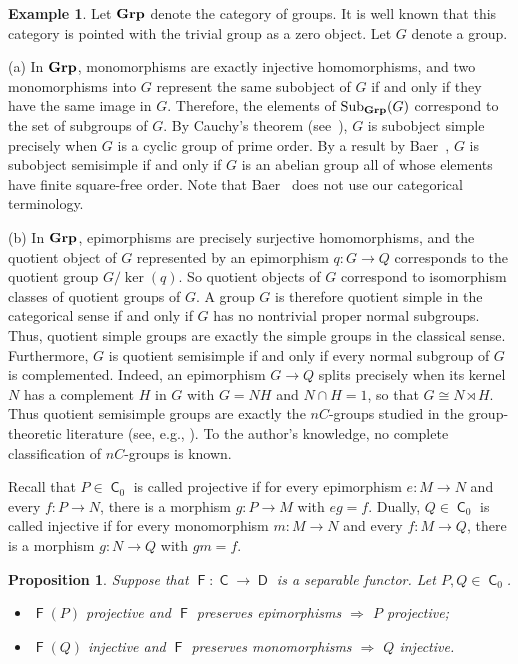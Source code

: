 \documentclass[12pt]{amsart}
\newtheorem{prop}[thm]{Proposition}
\theoremstyle{definition}
\newtheorem{exa}[thm]{Example}
\newcommand{\Grp}{{\bf Grp}}
\DeclareMathOperator{\C}{\mathsf C}
\DeclareMathOperator{\D}{\mathsf D}
\DeclareMathOperator{\Sub}{Sub}
\DeclareMathOperator{\F}{\mathsf F}
\begin{document}
\begin{exa}
Let $\Grp$ denote the category of groups.
It is well known that this category is
pointed with the trivial group as a 
zero object. Let $G$ denote a group.

(a) In $\Grp$, monomorphisms are exactly 
injective homomorphisms, and two 
monomorphisms into $G$ represent the 
same subobject of $G$ if and only if 
they have the same image in $G$.
Therefore, the elements of $\Sub_{\Grp}(G)$
correspond to the set of subgroups of $G$.
By Cauchy's theorem 
(see~\cite[Thm. 11, p.~93]{dummit2004}), 
$G$ is subobject simple precisely when
$G$ is a cyclic group of prime order. 
By a result by 
Baer~\cite[Thm. 3]{baer1946}, $G$ is
subobject semisimple if and only if
$G$ is an abelian group all of whose elements have
finite square-free order. 
Note that Baer~\cite{baer1946}
does not use our categorical terminology.

(b) In $\Grp$, epimorphisms are precisely
surjective homomorphisms, and the quotient
object of $G$ represented by an epimorphism 
$q : G \to Q$ corresponds to the quotient group 
$G / \ker(q)$. So quotient objects of $G$ correspond 
to isomorphism classes of quotient 
groups of $G$.
A group $G$ is therefore 
quotient simple in the categorical
sense if and only if $G$ has no nontrivial
proper normal subgroups. 
Thus, quotient simple groups 
are exactly the simple groups in the
classical sense.
Furthermore, $G$ is 
quotient semisimple if and 
only if every normal subgroup of $G$ is 
complemented. 
Indeed, an epimorphism $G \to Q$ 
splits precisely when its kernel $N$ 
has a complement $H$ in $G$ with 
$G = NH$ and $N \cap H = 1$, so that 
$G \cong N \rtimes H$. 
Thus quotient semisimple groups are exactly 
the $nC$-groups studied in the 
group-theoretic literature
(see, e.g., \cite{christensen1967}).
To the author's knowledge, no complete classification
of $nC$-groups is known.
\end{exa}

Recall that $P \in \C_0$ is called
projective if for every epimorphism
$e : M \to N$ and every 
$f : P \to N$, there is a morphism
$g : P \to M$ with $e g = f$. 
Dually, $Q \in \C_0$ is called injective if for every monomorphism 
$m : M \to N$ and every  
$f : M \to Q$, there is a morphism
$g : N \to Q$ with $g m = f$.

\begin{prop}\label{prop:Fseparableprojective}
Suppose that $\F : \C \to \D$ is a separable
functor. Let $P,Q \in \C_0$.
\begin{itemize}[widest=(a)]

\item[{\rm (a)}] $\F(P)$ projective and
$\F$ preserves epimorphisms
$\Longrightarrow$ $P$ projective;

\item[{\rm (b)}] $\F(Q)$ injective and
$\F$ preserves monomorphisms
$\Longrightarrow$ $Q$ injective.

\end{itemize}
\end{prop}
\end{document}
